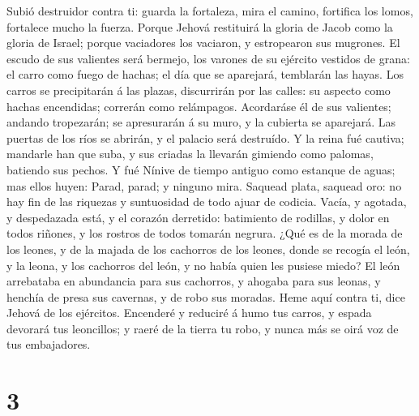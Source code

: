  Subió destruidor contra ti: guarda la fortaleza, mira el
camino, fortifica los lomos, fortalece mucho la fuerza. 
Porque Jehová restituirá la gloria de Jacob como la gloria de Israel;
porque vaciadores los vaciaron, y estropearon sus mugrones. 
El escudo de sus valientes será bermejo, los varones de su ejército
vestidos de grana: el carro como fuego de hachas; el día que se
aparejará, temblarán las hayas.  Los carros se precipitarán
á las plazas, discurrirán por las calles: su aspecto como hachas
encendidas; correrán como relámpagos.  Acordaráse él de sus
valientes; andando tropezarán; se apresurarán á su muro, y la cubierta
se aparejará.  Las puertas de los ríos se abrirán, y el
palacio será destruído.  Y la reina fué cautiva; mandarle
han que suba, y sus criadas la llevarán gimiendo como palomas, batiendo
sus pechos.  Y fué Nínive de tiempo antiguo como estanque de
aguas; mas ellos huyen: Parad, parad; y ninguno mira. 
Saquead plata, saquead oro: no hay fin de las riquezas y suntuosidad de
todo ajuar de codicia.  Vacía, y agotada, y despedazada
está, y el corazón derretido: batimiento de rodillas, y dolor en todos
riñones, y los rostros de todos tomarán negrura.  ¿Qué es
de la morada de los leones, y de la majada de los cachorros de los
leones, donde se recogía el león, y la leona, y los cachorros del león,
y no había quien les pusiese miedo?  El león arrebataba en
abundancia para sus cachorros, y ahogaba para sus leonas, y henchía de
presa sus cavernas, y de robo sus moradas.  Heme aquí
contra ti, dice Jehová de los ejércitos. Encenderé y reduciré á humo tus
carros, y espada devorará tus leoncillos; y raeré de la tierra tu robo,
y nunca más se oirá voz de tus embajadores.

\hypertarget{section-2}{%
\section{3}\label{section-2}}

